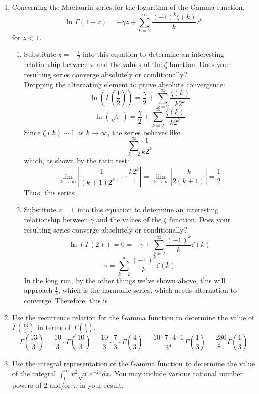\documentclass{article}
\begin{document}
\begin{enumerate}
\begin{enumerate}
        \[\boxed{\tan x = \sum_{n=1}^{\infty} \frac{2(4^n)x^{2n-1}}{\pi^{2n}}(1-2^{-2n})\zeta(2n)}\]
    \end{enumerate}
    \item Concerning the Maclaurin series for the logarithm of the Gamma function, 
    \[\ln \Gamma(1+z) = -\gamma z + \sum_{k=2}^{\infty} \frac{(-1)^k\zeta(k)}{k}z^k\]
    for $z < 1$.
    \begin{enumerate}
        \item Substitute $z = - \frac 1 2$ into this equation to determine an interesting relationship between $\pi$ and the values of the $\zeta$ function. Does your resulting series converge absolutely or conditionally?
        \[\]
        Dropping the alternating element to prove absolute convergence:
        \[\ln(\Gamma\left(\frac 1 2\right)) = \frac{\gamma}{2} + \sum_{k=2}^{\infty} \frac{\zeta(k)}{k2^k}\]
        \[\ln(\sqrt{\pi}) = \frac{\gamma}{2} + \sum_{k=2}^{\infty} \frac{\zeta(k)}{k2^k}\]
        Since $\zeta(k) \sim 1$ as $k \to \infty$, the series behaves like
        \[\sum_{k=2}^{\infty} \frac{1}{k2^k}\]
        which, as shown by the ratio test:
        \[\lim_{k \to \infty} \left|\frac{1}{(k+1)2^{k+1}} \cdot \frac{k2^k}{1} \right| = \lim_{k \to \infty} \left| \frac{k}{2(k+1)}\right| = \frac{1}{2}\]
        Thus, this series .
        \item Substitute $z = 1$ into this equation to determine an interesting relationship between $\gamma$ and the values of the $\zeta$ function. Does your resulting series converge absolutely or conditionally?
        \[\ln(\Gamma(2)) = 0 = -\gamma + \sum_{k=2}^{\infty} \frac{(-1)^k}{k} \zeta(k)\]
        \[\gamma = \sum_{k=2}^{\infty} \frac{(-1)^k}{k} \zeta(k)\]
        In the long run, by the other things we've shown above, this will approach $\frac{1}{k}$, which is the harmonic series, which needs alternation to converge. Therefore, this is 
    \end{enumerate}
    \item Use the recurrence relation for the Gamma function to determine the value of $\Gamma(\frac{13}{3})$ in terms of $\Gamma(\frac{1}{3})$.
    \[\]
    \[\Gamma\left( \frac {13} 3\right) = \frac{10}{3} \cdot \Gamma\left( \frac {10} 3\right) = \frac{10}{3} \cdot \frac{7}{3} \cdot \Gamma\left( \frac 4 3\right) = \frac{10\cdot7\cdot4\cdot1}{3^4}\Gamma\left( \frac 1 3\right) = \boxed{\frac{280}{81}\Gamma\left( \frac 1 3\right)}\]
    \item Use the integral representation of the Gamma function to determine the value of the integral $\int_{0}^{\infty} x^2\sqrt x e^{-2x}dx$. You may include various rational number powers of 2 and/or $\pi$ in your result.

\end{enumerate}
\end{document}
